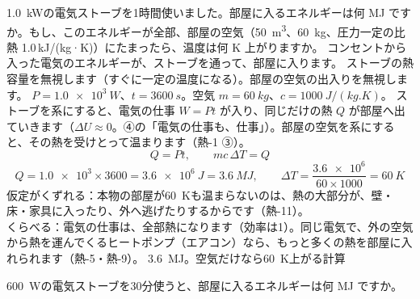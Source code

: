 \label{ph:熱-2:ex10}
\begin{phreidai}[電気ストーブが部屋に入れるエネルギー]
\qty{1.0}{kW}の電気ストーブを1時間使いました。部屋に入るエネルギーは何 MJ ですか。もし、このエネルギーが全部、部屋の空気（\qty{50}{m^3}、\qty{60}{kg}、圧力一定の比熱 1.0\,kJ/(kg·K)）にたまったら、温度は何 K 上がりますか。
\phbamen
コンセントから入った電気のエネルギーが、ストーブを通って、部屋に入ります。
\phmushi
ストーブの熱容量を無視します（すぐに一定の温度になる）。部屋の空気の出入りを無視します。
\phzu
$P=\qty{1.0e3}{W}$、$t=\qty{3600}{s}$。空気 $m=\qty{60}{kg}$、$c=\qty{1000}{J/(kg.K)}$。
\phriyu
ストーブを系にすると、電気の仕事 $W=Pt$ が入り、同じだけの熱 $Q$ が部屋へ出ていきます（$\Delta U\approx0$。④の「電気の仕事も、仕事」）。部屋の空気を系にすると、その熱を受けとって温まります（熱-1 ③）。
\phtateru
\[Q=Pt,\qquad mc\,\Delta T=Q\]
\phtoku
\[Q=\num{1.0e3}\times3600=\qty{3.6e6}{J}=\qty{3.6}{MJ},\qquad \Delta T=\frac{\num{3.6e6}}{60\times1000}=\qty{60}{K}\]
\phtashikame
仮定がくずれる：本物の部屋が\qty{60}{K}も温まらないのは、熱の大部分が、壁・床・家具に入ったり、外へ逃げたりするからです（熱-11）。\\
くらべる：電気の仕事は、全部熱になります（効率は1）。同じ電気で、外の空気から熱を運んでくるヒートポンプ（エアコン）なら、もっと多くの熱を部屋に入れられます（熱-5・熱-9）。
\kotae \qty{3.6}{MJ}。空気だけなら\qty{60}{K}上がる計算
\end{phreidai}
\begin{jibun}
\qty{600}{W}の電気ストーブを30分使うと、部屋に入るエネルギーは何 MJ ですか。
\end{jibun}

